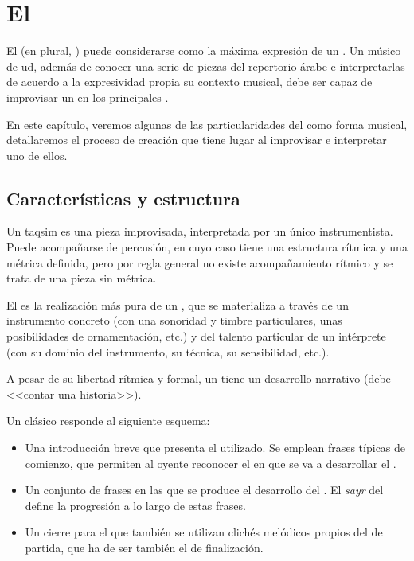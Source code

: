 \chapter{El \taqsim}
\label{taqsim2}


\pagestyle{fancyplain}

El \taqsim (en plural, \taqasimb) puede considerarse como la máxima expresión de un \maqamb. Un músico de ud, además de conocer una serie de piezas del repertorio árabe e interpretarlas de acuerdo a la expresividad propia su contexto musical, debe ser capaz de improvisar un \taqsim en los principales \maqamaatb.

En este capítulo, veremos algunas de las particularidades del \taqsim como forma musical, detallaremos el proceso de creación que tiene lugar al improvisar e interpretar uno de ellos.

\section{Características y estructura}

Un taqsim es una pieza improvisada, interpretada por un único instrumentista. Puede acompañarse de percusión, en cuyo caso tiene una estructura rítmica y una métrica definida, pero por regla general no existe acompañamiento rítmico y se trata de una pieza sin métrica.

El \taqsim es la realización más pura de un \maqamb, que se materializa a través de un instrumento concreto (con una sonoridad y timbre particulares, unas posibilidades de ornamentación, etc.) y del talento particular de un intérprete (con su dominio del instrumento, su técnica, su sensibilidad, etc.).

A pesar de su libertad rítmica y formal, un \taqsim tiene un desarrollo narrativo (debe <<contar una historia>>).

Un \taqsim clásico responde al siguiente esquema:

\begin{itemize}
\item Una introducción breve que presenta el \maqam utilizado. Se emplean frases típicas de comienzo, que permiten al oyente reconocer el \maqam en que se va a desarrollar el \taqsimb.
\item Un conjunto de frases en las que se produce el desarrollo del \taqsimb. El \emph{sayr} del \maqam define la progresión a lo largo de estas frases.
\item Un cierre para el que también se utilizan clichés melódicos propios del \maqam de partida, que ha de ser también el de finalización.
\end{itemize}

